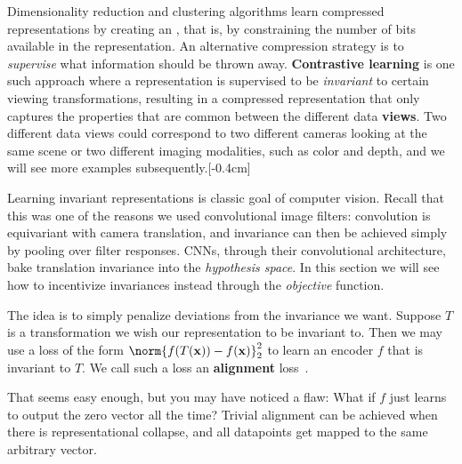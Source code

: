 Dimensionality reduction and clustering algorithms learn compressed representations by creating an , that is, by constraining the number of bits available in the representation. An alternative compression strategy is to \textit{supervise} what information should be thrown away. {\bf Contrastive learning} is one such approach where a representation is supervised to be \textit{invariant} to certain viewing transformations, resulting in a compressed representation that only captures the properties that are common between the different data \textbf{views}. Two different data views could correspond to two different cameras looking at the same scene or two different imaging modalities, such as color and depth, and we will see more examples subsequently.[-0.4cm]

Learning invariant representations is classic goal of computer vision. Recall that this was one of the reasons we used convolutional image filters: convolution is equivariant with camera translation, and invariance can then be achieved simply by pooling over filter responses. CNNs, through their convolutional architecture, bake translation invariance into the \textit{hypothesis space}. In this section we will see how to incentivize invariances instead through the \textit{objective} function.

The idea is to simply penalize deviations from the invariance we want. Suppose $T$ is a transformation we wish our representation to be invariant to. Then we may use a loss of the form $\norm{f(T(\mathbf{x}))-f(\mathbf{x})}_2^2$ to learn an encoder $f$ that is invariant to $T$. We call such a loss an \textbf{alignment} loss~\cite{wang2020hypersphere}.

That seems easy enough, but you may have noticed a flaw: What if $f$ just learns to output the zero vector all the time? Trivial alignment can be achieved when there is representational collapse, and all datapoints get mapped to the same arbitrary vector.

